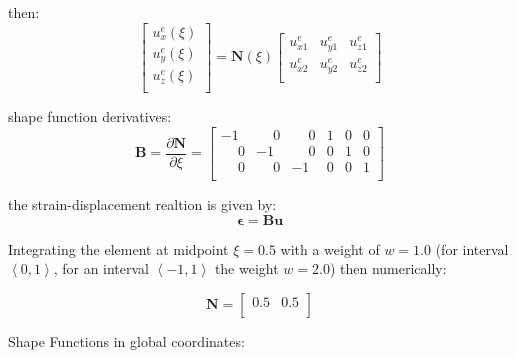 \documentclass[10pt,b5paper,titlepage]{book}
\newcommand{\m}{\mathbf}
\newcommand{\M}{\pmb}
\begin{document}
then:
\begin{equation}
    \begin{bmatrix}
        u_x^e(\xi) \\
        u_y^e(\xi) \\
        u_z^e(\xi) \\
    \end{bmatrix}
    = \m{N}(\xi) \begin{bmatrix}
        u_{x1}^e & u_{y1}^e& u_{z1}^e \\
        u_{x2}^e & u_{y2}^e& u_{z2}^e \\
    \end{bmatrix}
\end{equation}

shape function derivatives:
\begin{equation}
    \m{B} = \frac{\partial \m{N}}{\partial \xi} =
    \begin{bmatrix}
        -1 & \phantom{-}0 & \phantom{-}0 & 1 & 0 & 0 \\
        \phantom{-}0 & -1 & \phantom{-}0 & 0 & 1 & 0  \\
        \phantom{-}0 & \phantom{-}0 & -1 & 0 & 0 & 1  \\
    \end{bmatrix}
\end{equation}

the strain-displacement realtion is given by:
\begin{equation}
    \M{\epsilon} = \m{B} \m{u}
\end{equation}

Integrating the element at midpoint $ \xi = 0.5 $ with a weight of $ w = 1.0 $
(for interval $ \left< 0, 1 \right> $, for an interval
$ \left< -1,  1 \right> $ the weight $ w = 2.0 $)
then numerically:

\begin{equation}
    \m{N} = \begin{bmatrix}
        0.5 & 0.5 \\
    \end{bmatrix}
\end{equation}

Shape Functions in global coordinates:
\end{document}
